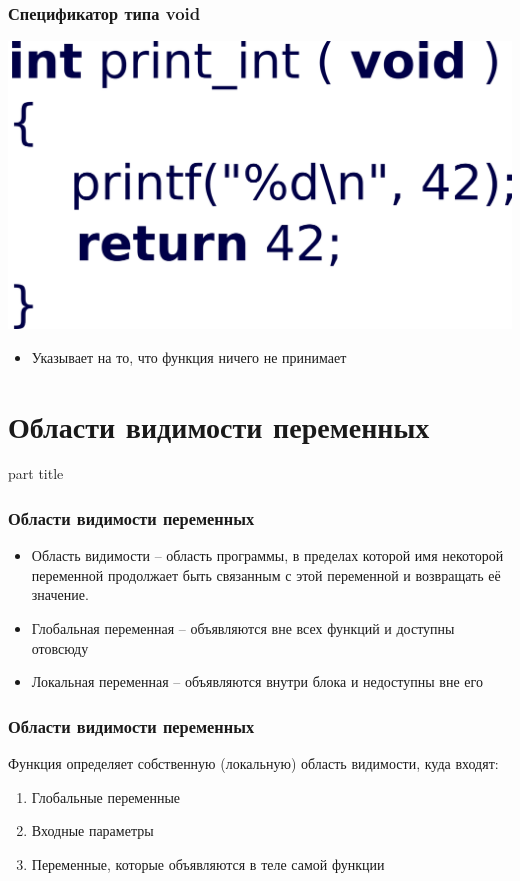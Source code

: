 \documentclass[14pt,pdf,hyperref={unicode}]{beamer}
\begin{document}
\begin{frame}[fragile]
\frametitle{Спецификатор типа void} 
\begin{center}
\includegraphics[width=0.45\linewidth]{images/function_void2.png}
\end{center}
\begin{itemize}
\item Указывает на то, что функция ничего не принимает
\end{itemize}
\end{frame}


\section{Области видимости переменных}
\begin{frame}
\begin{center}
\begin{beamercolorbox}[sep=8pt,center]{part
title}
\insertsection
\end{beamercolorbox}
\end{center}
\end{frame}

\begin{frame}[fragile]
\frametitle{Области видимости переменных} 
\begin{itemize}
\item Область видимости -- область программы, в пределах которой имя некоторой переменной продолжает быть связанным с этой переменной и возвращать её значение.
\item Глобальная переменная -- объявляются вне всех функций и доступны отовсюду
\item Локальная переменная --  объявляются внутри блока и недоступны вне его
\end{itemize}
\end{frame}

\begin{frame}[fragile]
\frametitle{Области видимости переменных} 
Функция определяет собственную (локальную) область видимости, куда входят:
\begin{enumerate}
\item Глобальные переменные
\item Входные параметры
\item Переменные, которые объявляются в теле самой функции
\end{enumerate}
\end{frame}
\end{document}
